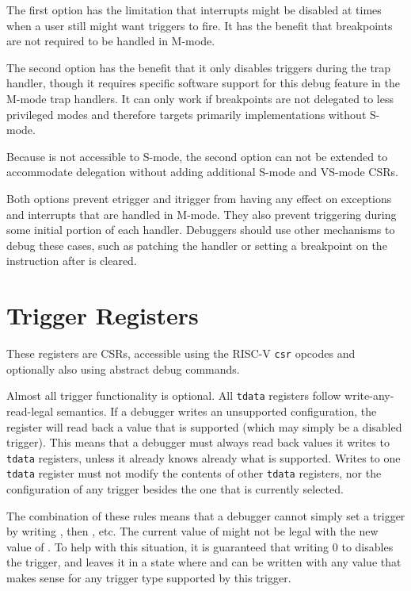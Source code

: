 \begin{commentary}
The first option has the limitation that interrupts might be disabled at
times when a user still might want triggers to fire.  It has the benefit
that breakpoints are not required to be handled in M-mode.

The second option has the benefit that it only disables triggers during
the trap handler, though it requires specific software support for this debug
feature in the M-mode trap handlers.  It can only work if breakpoints are not
delegated to less privileged modes and therefore targets primarily
implementations without S-mode.

Because \RcsrTcontrol is not accessible to S-mode, the second option can
not be extended to accommodate delegation without adding additional S-mode
and VS-mode CSRs.

Both options prevent etrigger and itrigger from having any effect on
exceptions and interrupts that are handled in M-mode.  They also prevent
triggering during some initial portion of each handler.  Debuggers should
use other mechanisms to debug these cases, such as patching the handler
or setting a breakpoint on the instruction after \FcsrMstatusMie is cleared.
\end{commentary}

\section{Trigger Registers}

These registers are CSRs, accessible using the RISC-V {\tt csr} opcodes and
optionally also using abstract debug commands.

Almost all trigger functionality is optional. All {\tt tdata} registers follow
write-any-read-legal semantics. If a debugger writes an unsupported
configuration, the register will read back a value that is supported (which may
simply be a disabled trigger).  This means that a debugger must always read
back values it writes to {\tt tdata} registers, unless it already knows already
what is
supported.  Writes to one {\tt tdata} register must not modify the contents of
other {\tt tdata} registers, nor the configuration of any trigger besides the
one that is currently selected.

The combination of these rules means that a debugger cannot simply set a
trigger by writing \RcsrTdataOne, then \RcsrTdataTwo, etc. The current value
of \RcsrTdataTwo might not be legal with the new value of \RcsrTdataOne. To
help with this situation, it is guaranteed that writing 0 to \RcsrTdataOne
disables the trigger, and leaves it in a state where \RcsrTdataTwo and
\RcsrTdataThree can be written with any value that makes sense for any
trigger type supported by this trigger.

